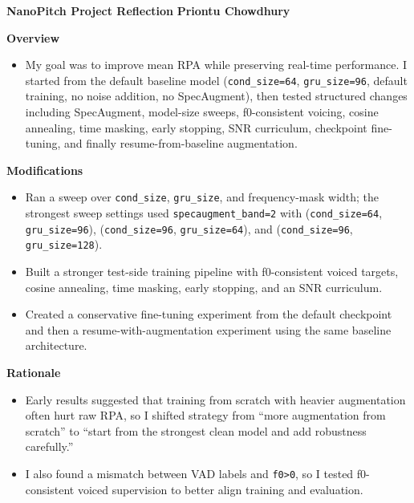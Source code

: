 \documentclass[10pt]{article}
\begin{document}
\small

{\Large \textbf{NanoPitch Project Reflection}} \hfill \textbf{Priontu Chowdhury}

\vspace{0.4em}
\textbf{Overview}
\begin{itemize}
    \item My goal was to improve mean RPA while preserving real-time performance. I started from the default baseline model (\texttt{cond\_size=64}, \texttt{gru\_size=96}, default training, no noise addition, no SpecAugment), then tested structured changes including SpecAugment, model-size sweeps, f0-consistent voicing, cosine annealing, time masking, early stopping, SNR curriculum, checkpoint fine-tuning, and finally resume-from-baseline augmentation.
\end{itemize}

\textbf{Modifications}
\begin{itemize}
    \item Ran a sweep over \texttt{cond\_size}, \texttt{gru\_size}, and frequency-mask width; the strongest sweep settings used \texttt{specaugment\_band=2} with (\texttt{cond\_size=64}, \texttt{gru\_size=96}), (\texttt{cond\_size=96}, \texttt{gru\_size=64}), and (\texttt{cond\_size=96}, \texttt{gru\_size=128}).
    \item Built a stronger test-side training pipeline with f0-consistent voiced targets, cosine annealing, time masking, early stopping, and an SNR curriculum.
    \item Created a conservative fine-tuning experiment from the default checkpoint and then a resume-with-augmentation experiment using the same baseline architecture.
\end{itemize}

\textbf{Rationale}
\begin{itemize}
    \item Early results suggested that training from scratch with heavier augmentation often hurt raw RPA, so I shifted strategy from ``more augmentation from scratch'' to ``start from the strongest clean model and add robustness carefully.''
    \item I also found a mismatch between VAD labels and \texttt{f0>0}, so I tested f0-consistent voiced supervision to better align training and evaluation.
\end{itemize}
\end{document}
